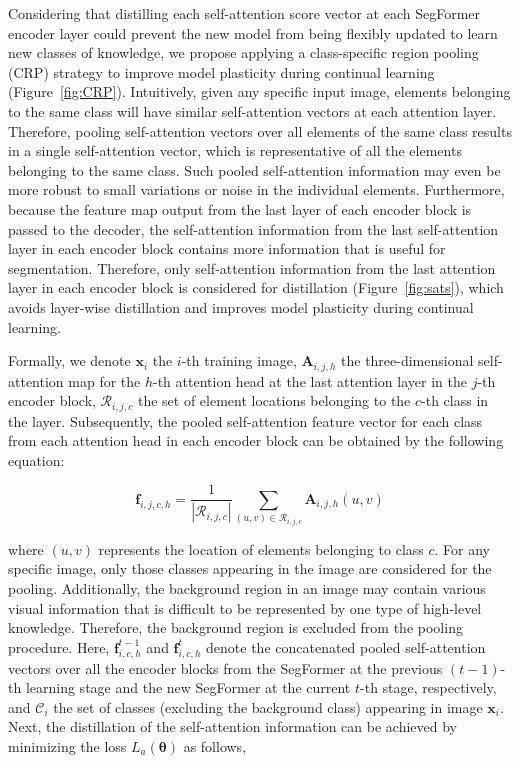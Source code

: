 \documentclass[onecolumn,conference,compsoc]{IEEEtran}
\begin{document}
\begin{spacing}{1.5}
Considering that {distilling} each self-attention score vector at each SegFormer encoder layer  {could prevent} the new model  {from} being flexibly updated to learn new classes of knowledge, we propose applying a class-specific region pooling (CRP) strategy to improve model plasticity during continual learning (Figure~\ref{fig:CRP}). Intuitively, given any specific input image, elements belonging to the same class will have similar self-attention vectors {at each attention layer}. Therefore, pooling self-attention vectors over all elements of the same class results in a single self-attention vector, which is representative  {of} all the elements belonging to the same class. Such pooled self-attention information may even be more robust to small variations or noise in the individual elements.  {Furthermore, because} the feature map output from the last layer of each encoder block is passed to the decoder, the self-attention information from the last self-attention layer in each encoder block contains more information that is useful for segmentation.  {Therefore,} only self-attention information from the last attention layer in each encoder block is considered for distillation (Figure~\ref{fig:sats}), which avoids layer-wise distillation and improves model plasticity during continual learning.

Formally,  we denote $\mathbf{x}_i$ the $i$-th training image, $\mathbf{A}_{i,j,h}$ the three-dimensional self-attention map for the $h$-th attention head at the last attention layer in the $j$-th encoder block, $\mathcal{R}_{i,j,c}$ the set of element locations belonging to the $c$-th class in the layer.  {Subsequently,} the pooled self-attention feature vector for each class from each attention head in each encoder block can be obtained by  {the following equation:}

\begin{equation}
    \mathbf{f}_{i,j,c,h} = \frac{1}{|\mathcal{R}_{i,j,c}|}\sum_{(u,v)\in \mathcal{R}_{i,j,c}}{\mathbf{A}_{i,j,h}(u,v)}
\end{equation}

\noindent where $(u,v)$ represents the location of elements belonging to class $c$. For any specific image, only those classes appearing in the image are considered for the pooling.  {Additionally,} the background region in an image may contain various visual information that is difficult to be represented by one type of  high-level knowledge. Therefore, the background region is excluded  {from} the pooling procedure.  {Here,} $\mathbf{f}^{t-1}_{i,c,h}$ and $\mathbf{f}^t_{i,c,h}$  {denote} the concatenated pooled self-attention vectors over all the encoder blocks from the SegFormer at the previous $(t-1)$-th learning stage and the new SegFormer at the current $t$-th stage, respectively, and $\mathcal{C}_i$ the set of classes (excluding the background class) appearing in image $\mathbf{x}_i$. Next, the distillation of the self-attention information can be achieved by minimizing the loss $L_a(\bm{\theta})$  {as follows,}


\end{spacing}
\end{document}
